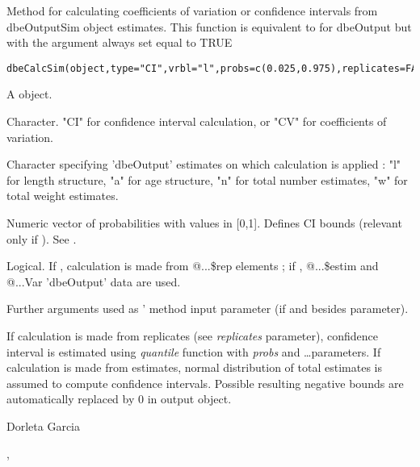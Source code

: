 \begin{Description}\relax
Method for calculating coefficients of variation or confidence intervals from dbeOutputSim object estimates. This function is equivalent
to  for dbeOutput but with the  argument always set equal to TRUE
\end{Description}
\begin{Usage}
\begin{verbatim}
dbeCalcSim(object,type="CI",vrbl="l",probs=c(0.025,0.975),replicates=FALSE,...)
\end{verbatim}
\end{Usage}
\begin{Arguments}
\begin{ldescription}
\item[\code{object}] A  object.
\item[\code{type}] Character. "CI" for confidence interval calculation, or "CV" for coefficients of variation.
\item[\code{vrbl}] Character specifying 'dbeOutput' estimates on which calculation is applied : "l" for length structure, "a" for age structure, "n" for total number estimates, "w" for total weight estimates.
\item[\code{probs}] Numeric vector of probabilities with values in [0,1]. Defines CI bounds (relevant only if ). See .
\item[\code{replicates}] Logical. If , calculation is made from @...\$rep elements ; if , @...\$estim and @...Var 'dbeOutput' data are used.
\item[\code{...}] Further arguments used as ' method input parameter (if  and besides  parameter).
\end{ldescription}
\end{Arguments}
\begin{Details}\relax
If calculation is made from replicates (see \emph{replicates} parameter), confidence interval is estimated using \emph{quantile} function with \emph{probs} and \dots parameters.
If calculation is made from estimates, normal distribution of total estimates is assumed to compute confidence intervals. 
Possible resulting negative bounds are automatically replaced by 0 in output object.
\end{Details}
\begin{Author}\relax
Dorleta Garcia 
\end{Author}
\begin{SeeAlso}\relax
{},  
\end{SeeAlso}

